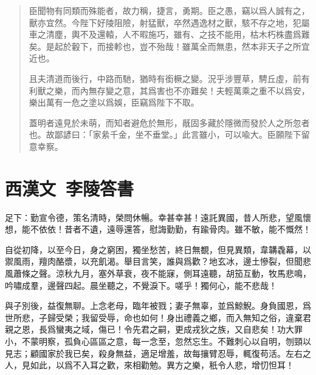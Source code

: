 \begin{quotation}
臣聞物有同類而殊能者，故力稱，捷言，勇期。臣之愚，竊以爲人誠有之，獸亦宜然。今陛下好陵阻險，射猛獸，卒然遇逸材之獸，駭不存之地，犯屬車之清塵，輿不及還轅，人不暇施巧，雖有、之技不能用，枯木朽株盡爲難矣。是起於轂下，而接軫也，豈不殆哉！雖萬全而無患，然本非天子之所宜近也。

且夫清道而後行，中路而馳，猶時有銜橛之變。況乎涉豐草，騁丘虛，前有利獸之樂，而內無存變之意，其爲害也不亦難矣！夫輕萬乘之重不以爲安，樂出萬有一危之塗以爲娛，臣竊爲陛下不取。

蓋明者遠見於未萌，而知者避危於無形，旤固多藏於隱微而發於人之所忽者也。故鄙諺曰：「家絫千金，坐不垂堂。」此言雖小，可以喩大。臣願陛下留意幸察。
\end{quotation}
\vspace{-1em}
\theendnotes

\section[李陵答蘇武書\quad{\small 西漢文}]{{\normalsize 西漢文\ 李陵}\quad 答書}
足下：勤宣令德，策名清時，榮問休暢。幸甚幸甚！遠託異國，昔人所悲，望風懷想，能不依依！昔者不遺，遠辱還答，慰誨勤勤，有踰骨肉。雖不敏，能不慨然！

自從初降，以至今日，身之窮困，獨坐愁苦，終日無覩，但見異類，韋韝毳幕，以禦風雨，羶肉酪漿，以充飢渴。舉目言笑，誰與爲歡？地玄冰，邊土慘裂，但聞悲風蕭條之聲。涼秋九月，塞外草衰，夜不能寐，側耳遠聽，胡笳互動，牧馬悲鳴，吟嘯成羣，邊聲四起。晨坐聽之，不覺淚下。嗟乎！獨何心，能不悲哉！

與子別後，益復無聊。上念老母，臨年被戮；妻子無辜，並爲鯨鯢。身負國恩，爲世所悲，子歸受榮；我留受辱，命也如何！身出禮義之鄉，而入無知之俗，違棄君親之恩，長爲蠻夷之域，傷已！令先君之嗣，更成戎狄之族，又自悲矣！功大罪小，不蒙明察，孤負心區區之意，每一念至，忽然忘生。不難刺心以自明，刎頸以見志；顧國家於我已矣，殺身無益，適足增羞，故每攘臂忍辱，輒復苟活。左右之人，見如此，以爲不入耳之歡，來相勸勉。異方之樂，秖令人悲，增忉怛耳！

